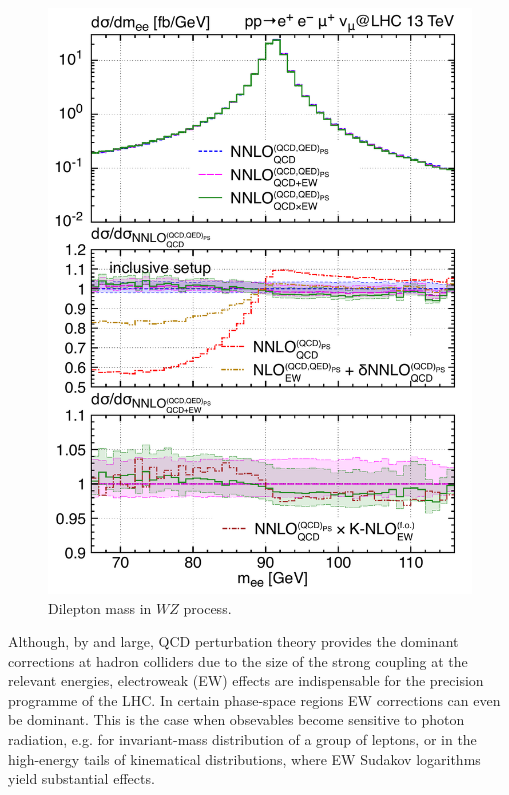 \documentclass{FBR_Bericht_2025}
\begin{document}
\begin{refsection}
\begin{figure}[b!]
\begin{center}
\includegraphics[width=0.95\linewidth]{plots/MiNNLO_EW_WZ_mZ.pdf}
\caption{Dilepton mass in $WZ$ process.}
\label{fig:WZ}
\end{center}
\end{figure}

Although, by and large, 
QCD perturbation theory provides the dominant corrections at hadron 
colliders due to the size of the strong coupling at the relevant energies, 
electroweak (EW) effects are indispensable for the precision programme of the LHC.
In certain phase-space regions EW corrections can even be dominant. This is the case
when obsevables become sensitive to photon radiation, e.g. for invariant-mass 
distribution of a group of leptons, or in the high-energy tails of kinematical distributions,
where EW Sudakov logarithms yield substantial effects.


\end{refsection}
\end{document}

